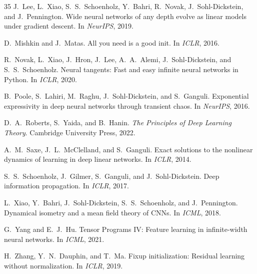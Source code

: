 \documentclass[10pt]{article}
\theoremstyle{definition}
\begin{document}
\begin{thebibliography}{35}
J.~Lee, L.~Xiao, S.~S.~Schoenholz, Y.~Bahri, R.~Novak, J.~Sohl-Dickstein, and J.~Pennington.
\newblock Wide neural networks of any depth evolve as linear models under gradient descent.
\newblock In \emph{NeurIPS}, 2019.

D.~Mishkin and J.~Matas.
\newblock All you need is a good init.
\newblock In \emph{ICLR}, 2016.

R.~Novak, L.~Xiao, J.~Hron, J.~Lee, A.~A.~Alemi, J.~Sohl-Dickstein, and S.~S.~Schoenholz.
\newblock Neural tangents: Fast and easy infinite neural networks in Python.
\newblock In \emph{ICLR}, 2020.

B.~Poole, S.~Lahiri, M.~Raghu, J.~Sohl-Dickstein, and S.~Ganguli.
\newblock Exponential expressivity in deep neural networks through transient chaos.
\newblock In \emph{NeurIPS}, 2016.

D.~A.~Roberts, S.~Yaida, and B.~Hanin.
\newblock \emph{The Principles of Deep Learning Theory}.
\newblock Cambridge University Press, 2022.

A.~M.~Saxe, J.~L.~McClelland, and S.~Ganguli.
\newblock Exact solutions to the nonlinear dynamics of learning in deep linear networks.
\newblock In \emph{ICLR}, 2014.

S.~S.~Schoenholz, J.~Gilmer, S.~Ganguli, and J.~Sohl-Dickstein.
\newblock Deep information propagation.
\newblock In \emph{ICLR}, 2017.

L.~Xiao, Y.~Bahri, J.~Sohl-Dickstein, S.~S.~Schoenholz, and J.~Pennington.
\newblock Dynamical isometry and a mean field theory of CNNs.
\newblock In \emph{ICML}, 2018.

G.~Yang and E.~J.~Hu.
\newblock Tensor Programs IV: Feature learning in infinite-width neural networks.
\newblock In \emph{ICML}, 2021.

H.~Zhang, Y.~N.~Dauphin, and T.~Ma.
\newblock Fixup initialization: Residual learning without normalization.
\newblock In \emph{ICLR}, 2019.

\end{thebibliography}
\endgroup

\clearpage
\appendix
\renewcommand{\thesection}{A\arabic{section}}
\setcounter{section}{0}
\end{document}

